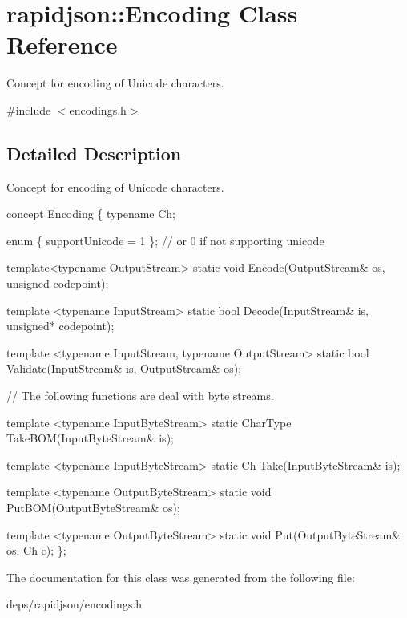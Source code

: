 \hypertarget{classrapidjson_1_1_encoding}{}\section{rapidjson\+:\+:Encoding Class Reference}
\label{classrapidjson_1_1_encoding}


Concept for encoding of Unicode characters.  




{\ttfamily \#include $<$encodings.\+h$>$}



\subsection{Detailed Description}
Concept for encoding of Unicode characters. 


\begin{DoxyCode}
concept Encoding \{
    \textcolor{keyword}{typename} Ch;    

    \textcolor{keyword}{enum} \{ supportUnicode = 1 \}; \textcolor{comment}{// or 0 if not supporting unicode}

    \textcolor{keyword}{template}<\textcolor{keyword}{typename} OutputStream>
    \textcolor{keyword}{static} \textcolor{keywordtype}{void} Encode(OutputStream& os, \textcolor{keywordtype}{unsigned} codepoint);

    \textcolor{keyword}{template} <\textcolor{keyword}{typename} InputStream>
    \textcolor{keyword}{static} \textcolor{keywordtype}{bool} Decode(InputStream& is, \textcolor{keywordtype}{unsigned}* codepoint);

    \textcolor{keyword}{template} <\textcolor{keyword}{typename} InputStream, \textcolor{keyword}{typename} OutputStream>
    \textcolor{keyword}{static} \textcolor{keywordtype}{bool} Validate(InputStream& is, OutputStream& os);

    \textcolor{comment}{// The following functions are deal with byte streams.}

    \textcolor{keyword}{template} <\textcolor{keyword}{typename} InputByteStream>
    \textcolor{keyword}{static} CharType TakeBOM(InputByteStream& is);

    \textcolor{keyword}{template} <\textcolor{keyword}{typename} InputByteStream>
    \textcolor{keyword}{static} Ch Take(InputByteStream& is);

    \textcolor{keyword}{template} <\textcolor{keyword}{typename} OutputByteStream>
    \textcolor{keyword}{static} \textcolor{keywordtype}{void} PutBOM(OutputByteStream& os);

    \textcolor{keyword}{template} <\textcolor{keyword}{typename} OutputByteStream>
    \textcolor{keyword}{static} \textcolor{keywordtype}{void} Put(OutputByteStream& os, Ch c);
\};
\end{DoxyCode}
 

The documentation for this class was generated from the following file\+:\begin{DoxyCompactItemize}
\item 
deps/rapidjson/encodings.\+h\end{DoxyCompactItemize}
